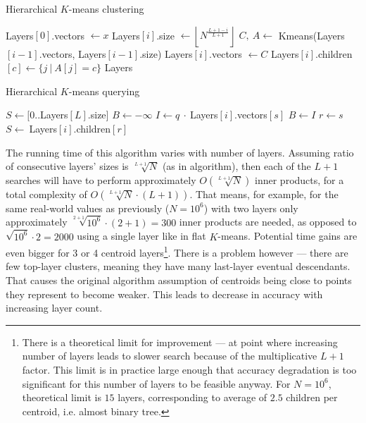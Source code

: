 \begin{algorithm}[H]
	\caption{Hierarchical $K$-means clustering}
	\begin{algorithmic}
		\State Layers$[0]$.vectors $\gets x $
			\State Layers$[i]$.size $\gets \left \lfloor N^{\frac{L + 1 - i}{L + 1}} \right \rfloor $
			\State $ C,\ A \gets$ Kmeans(Layers$[i - 1]$.vectors, Layers$[i - 1]$.size)
			\State Layers$[i]$.vectors $\gets C$
				\State Layers$[i]$.children$[c] \gets \{ j\ |\ A[j] = c \} $
			\EndFor
		\EndFor
		\State \Return Layers
	\end{algorithmic}
\end{algorithm}

\begin{algorithm}[H]
	\caption{Hierarchical $K$-means querying}
	\begin{algorithmic}
		\State $ S \gets [0..$Layers$[L].$size$]$
		\For{$ i = L,\dots,0 $}
			\State $ B \gets -\infty $
			\For{$ s \in S $}
				\State $ I \gets q\ \cdot\ $Layers$[i]$.vectors$[s]$
				\If{$ I > B $}
					\State $ B \gets I $
					\State $ r \gets s $
				\EndIf
			\EndFor
			\If{$ i = 0 $}
				\State \Return {$ r $}
			\EndIf
			\State $ S \gets\ $Layers$[i].$children$[r]$
		\EndFor
	\end{algorithmic}
\end{algorithm}

The running time of this algorithm varies with number of layers. Assuming 
ratio of consecutive layers' sizes is $ \sqrt[L+1]{N} $ (as in algorithm),
then each of the $ L + 1 $ searches will have to perform approximately
$ O(\sqrt[L+1]{N}) $ inner products, for a total complexity of
$ O(\sqrt[L+1]{N} \cdot (L + 1)) $. That means, for example, for the same real-world
values as previously ($ N=10^6 $) with two layers only approximately
$ \sqrt[2+1]{10^6} \cdot (2 + 1) = 300 $ inner products are needed, as opposed
to $ \sqrt{10^6} \cdot 2 = 2000 $ using a single layer like in flat $K$-means.
Potential time gains are even bigger for 3 or 4 centroid layers\footnote{
There is a theoretical limit for improvement --- at point where increasing
number of layers leads to slower search because of the multiplicative $L+1$ factor.
This limit is in practice large enough that accuracy degradation is too 
significant for this number of layers to be feasible anyway. 
For $N=10^6$, theoretical limit is $15$ layers, corresponding to average 
of $2.5$ children per centroid, i.e. almost binary tree.
}. There is a problem however --- there are few top-layer clusters,
meaning they have many last-layer eventual descendants. That causes the
original algorithm assumption of centroids being close to points they represent
to become weaker. This leads to decrease in accuracy with increasing layer
count.

